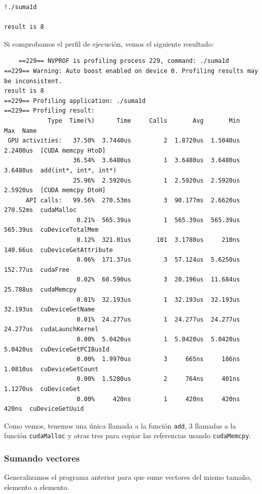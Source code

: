 \documentclass[11pt]{article}
\def\inline{\lstinline[basicstyle=\ttfamily,keywordstyle={}]}
\begin{document}
\begin{verbatim}
!./suma1d

result is 8
\end{verbatim}

Si comprobamos el perfil de ejecución, vemos el siguiente resultado:

\begin{verbatim}
	==229== NVPROF is profiling process 229, command: ./suma1d
==229== Warning: Auto boost enabled on device 0. Profiling results may be inconsistent.
result is 8
==229== Profiling application: ./suma1d
==229== Profiling result:
            Type  Time(%)      Time     Calls       Avg       Min       Max  Name
 GPU activities:   37.50%  3.7440us         2  1.8720us  1.5040us  2.2400us  [CUDA memcpy HtoD]
                   36.54%  3.6480us         1  3.6480us  3.6480us  3.6480us  add(int*, int*, int*)
                   25.96%  2.5920us         1  2.5920us  2.5920us  2.5920us  [CUDA memcpy DtoH]
      API calls:   99.56%  270.53ms         3  90.177ms  2.6620us  270.52ms  cudaMalloc
                    0.21%  565.39us         1  565.39us  565.39us  565.39us  cuDeviceTotalMem
                    0.12%  321.01us       101  3.1780us     210ns  140.66us  cuDeviceGetAttribute
                    0.06%  171.37us         3  57.124us  5.6250us  152.77us  cudaFree
                    0.02%  60.590us         3  20.196us  11.684us  25.788us  cudaMemcpy
                    0.01%  32.193us         1  32.193us  32.193us  32.193us  cuDeviceGetName
                    0.01%  24.277us         1  24.277us  24.277us  24.277us  cudaLaunchKernel
                    0.00%  5.0420us         1  5.0420us  5.0420us  5.0420us  cuDeviceGetPCIBusId
                    0.00%  1.9970us         3     665ns     186ns  1.0810us  cuDeviceGetCount
                    0.00%  1.5280us         2     764ns     401ns  1.1270us  cuDeviceGet
                    0.00%     420ns         1     420ns     420ns     420ns  cuDeviceGetUuid
\end{verbatim}

Como vemos, tenemos una única llamada a la función \inline{add}, $3$ llamadas a la función \inline{cudaMalloc} y otras tres para copiar las referencias usando \inline{cudaMemcpy}. 


\subsubsection{Sumando vectores}

Generalizamos el programa anterior para que sume vectores del mismo tamaño, elemento a elemento.
\end{document}
